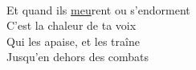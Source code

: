 \\
Et quand ils \underline{meu}rent ou s'endorment\\
C'est la chaleur de ta voix\\
Qui les apaise, et les traîne\\
Jusqu'en dehors des combats\\

